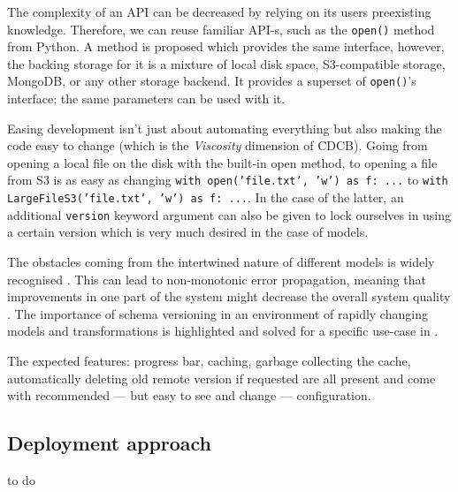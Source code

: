 The complexity of an API can be decreased by relying on its users preexisting knowledge. Therefore, we can reuse familiar API-s, such as the \texttt{open()} method from Python. A method is proposed which provides the same interface, however, the backing storage for it is a mixture of local disk space, S3-compatible storage, MongoDB, or any other storage backend. It provides a superset of \texttt{open()}'s interface; the same parameters can be used with it.

Easing development isn't just about automating everything but also making the code easy to change (which is the \textit{Viscosity} dimension of CDCB). Going from opening a local file on the disk with the built-in open method, to opening  a file from S3 is as easy as changing \texttt{with open('file.txt', 'w') as f: ...} to \texttt{with LargeFileS3('file.txt', 'w') as f: ...}. In the case of the latter, an additional \texttt{version} keyword argument can also be given to lock ourselves in using a certain version which is very much desired in the case of models.

The obstacles coming from the intertwined nature of different models is widely recognised \cite{sculley2015hidden,haakman2021ai,amershi2019software}. This can lead to non-monotonic error propagation, meaning that improvements in one part of the system might decrease the overall system quality \cite{amershi2019software}. The importance of schema versioning in an environment of rapidly changing models and transformations is highlighted and solved for a specific use-case in \cite{van2017versioning}.

The expected features: progress bar, caching, garbage collecting the cache, automatically deleting old remote version if requested are all present and come with recommended --- but easy to see and change --- configuration.

\subsection{Deployment approach}


to do

